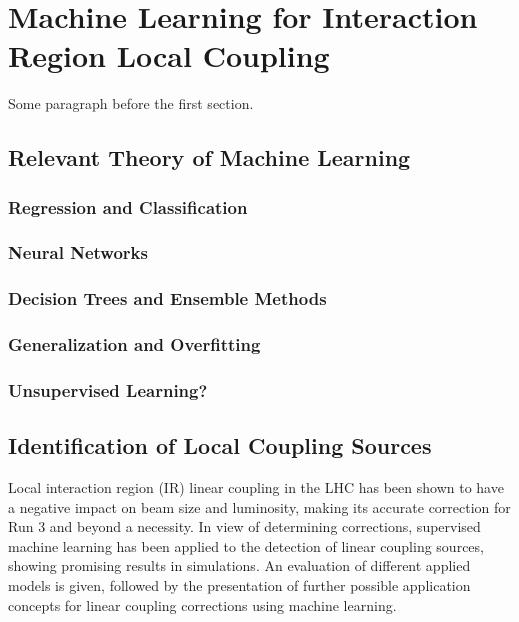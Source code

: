 \chapter{Machine Learning for Interaction Region Local Coupling} %
\label{chapter:ml_local_coupling} %


Some paragraph before the first section.


\section{Relevant Theory of Machine Learning}

\subsection{Regression and Classification}

\subsection{Neural Networks}

\subsection{Decision Trees and Ensemble Methods}

\subsection{Generalization and Overfitting}

\subsection{Unsupervised Learning?}


\section{Identification of Local Coupling Sources}

Local interaction region (IR) linear coupling in the LHC has been shown to have a negative impact on beam size and luminosity, making its accurate correction for Run 3 and beyond a necessity.
In view of determining corrections, supervised machine learning has been applied to the detection of linear coupling sources, showing promising results in simulations.
An evaluation of different applied models is given, followed by the presentation of further possible application concepts for linear coupling corrections using machine learning.

